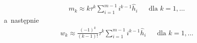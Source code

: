 \documentclass[paper=a4,DIV=12]{lpas}
\begin{document}
\begin{appendices}
\begin{equation}
\begin{aligned}
      & m_k \approx k \tau^k \sum_{i=1}^{m-1} {i^{k-1} \hat{h}_i} &
      & \text{dla } k = 1,\dots &
    \end{aligned}
    \label{eq:YKY27}
  \end{equation}
  a~następnie
  \begin{equation}
    \begin{aligned}
      & w_k \approx \frac{(-1)^k}{(k-1)!} \tau^k \sum_{i=1}^{m-1} {i^{k-1} \hat{h}_i} &
      & \text{dla } k = 1,\dots &
    \end{aligned}
  \end{equation}
\end{appendices}

\end{document}
